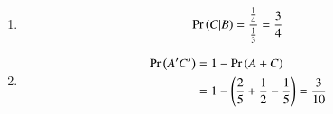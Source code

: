 \begin{enumerate}
\item 
\begin{align}
\Pr\left(C | B\right)
=\frac{\frac{1}{4}}{\frac{1}{3}}
=\frac{3}{4}
\end{align} 
\item 
\begin{align}
\Pr\left(A^{\prime} C^{\prime}\right)
&=1-\Pr\left(A+C\right)\\
&=1-\left(\frac{2}{5}+\frac{1}{2}-\frac{1}{5}\right)
=\frac{3}{10}
\end{align}
\end{enumerate}
